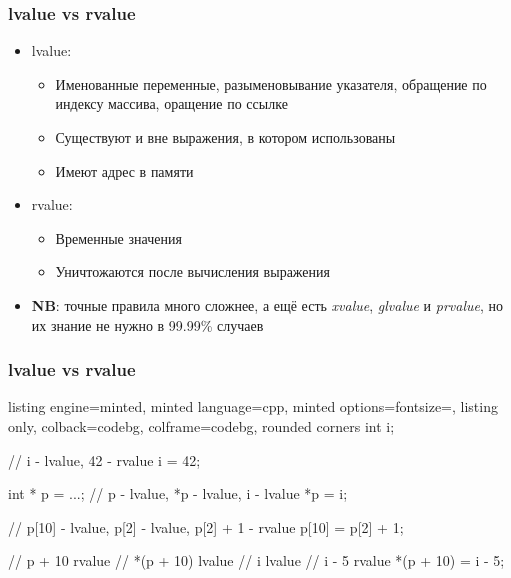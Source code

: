 \documentclass[10pt]{beamer}
\begin{document}
\begin{frame}[fragile]
\frametitle{lvalue vs rvalue}
\begin{itemize}
\item lvalue:
\pause
\begin{itemize}
\item Именованные переменные, разыменовывание указателя, обращение по индексу массива, оращение по ссылке
\pause
\item Существуют и вне выражения, в котором использованы
\pause
\item Имеют адрес в памяти
\end{itemize}
\pause
\item rvalue:
\pause
\begin{itemize}
\item Временные значения
\pause
\item Уничтожаются после вычисления выражения
\end{itemize}
\pause
\item \textbf{NB}: точные правила много сложнее, а ещё есть \textit{xvalue}, \textit{glvalue} и \textit{prvalue}, но их знание не нужно в 99.99\% случаев
\end{itemize}
\end{frame}

\begin{frame}[fragile]
\frametitle{lvalue vs rvalue}
\begin{itemize}
\begin{tcblisting}{listing engine=minted, minted language=cpp, minted options={fontsize=\scriptsize}, listing only, colback=codebg, colframe=codebg, rounded corners}
int i;

// i - lvalue, 42 - rvalue
i = 42;

int * p = ...;
// p - lvalue, *p - lvalue, i - lvalue
*p = i;

// p[10] - lvalue, p[2] - lvalue, p[2] + 1 - rvalue
p[10] = p[2] + 1;

//    p + 10   rvalue
// *(p + 10)   lvalue
//         i   lvalue
//     i - 5   rvalue
*(p + 10) = i - 5;
\end{tcblisting}
\end{itemize}
\end{frame}
\end{document}

